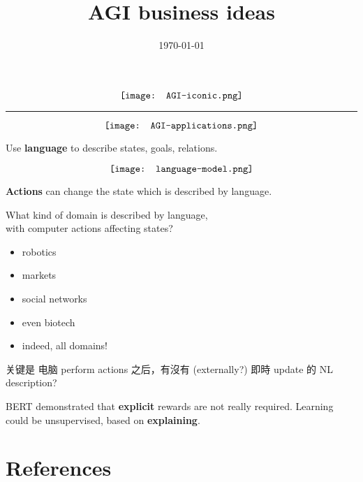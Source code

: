 \title{AGI business ideas}
\date{\today}
\maketitle

\begin{equation}
\vcenter{\hbox{\texttt{[image: AGI-iconic.png]}}}
\end{equation}


\begin{center}
	\rule{0.8\textwidth}{1pt}
\end{center}

\begin{equation}
\vcenter{\hbox{\texttt{[image: AGI-applications.png]}}}
\end{equation}

Use \textbf{language} to describe states, goals, relations.

\begin{equation}
\vcenter{\hbox{\texttt{[image: language-model.png]}}}
\end{equation}

\textbf{Actions} can change the state which is described by language.

What kind of domain is described by language, \\
with computer actions affecting states?
\begin{itemize}
\item robotics
\item markets
\item social networks
\item even biotech
\item indeed, all domains!
\end{itemize}

关键是 电脑 perform actions 之后，有沒有 (externally?) 即時 update 的 NL description?

BERT demonstrated that \textbf{explicit} rewards are not really required.  Learning could be unsupervised, based on \textbf{explaining}.

\section*{References}

 
